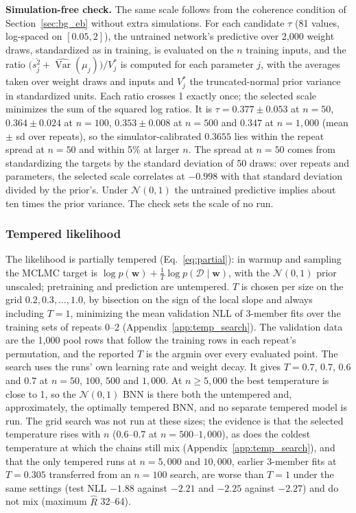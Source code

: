 \documentclass[11pt]{article}
\begin{document}
\textbf{Simulation-free check.} The same scale follows from the coherence condition of Section~\ref{sec:bg_eb} without
extra simulations. For each candidate $\tau$ (81 values, log-spaced on $[0.05,2]$), the untrained network's predictive
over 2{,}000 weight draws, standardized as in training, is evaluated on the $n$ training inputs, and the ratio
$\big(\overline{s_j^2}+\widehat{\operatorname{Var}}(\mu_j)\big)/V_j^\ast$ is computed for each parameter $j$, with the
averages taken over weight draws and inputs and $V_j^\ast$ the truncated-normal prior variance in standardized units.
Each ratio crosses 1 exactly once; the selected scale minimizes the sum of the squared log ratios. It is
$\tau=0.377\pm0.053$ at $n=50$, $0.364\pm0.024$ at $n=100$, $0.353\pm0.008$ at $n=500$ and $0.347$ at $n=1{,}000$
(mean $\pm$ sd over repeats), so the simulator-calibrated $0.3655$ lies within the repeat spread at $n=50$ and within
5\% at larger $n$. The spread at $n=50$ comes from standardizing the targets by the standard deviation of 50 draws: over
repeats and parameters, the selected scale correlates at $-0.998$ with that standard deviation divided by the prior's.
Under $\mathcal{N}(0,1)$ the untrained predictive implies about ten times the prior variance. The check sets the scale
of no run.

\subsubsection{Tempered likelihood}
\label{sec:bnn_temp}
The likelihood is partially tempered (Eq.~\eqref{eq:partial}): in warmup and sampling the MCLMC target is
$\log p(\mathbf w)+\tfrac1T\log p(\mathcal{D}\mid\mathbf w)$, with the $\mathcal{N}(0,1)$ prior unscaled; pretraining
and prediction are untempered. $T$ is chosen per size on the grid $0.2,0.3,\dots,1.0$, by bisection on the sign of the
local slope and always including $T=1$, minimizing the mean validation NLL of 3-member fits over the training sets of repeats 0--2 (Appendix~\ref{app:temp_search}). The
validation data are the 1{,}000 pool rows that follow the training rows in each repeat's permutation, and the reported
$T$ is the argmin over every evaluated point. The search uses the runs' own learning rate and weight decay. It gives
$T=0.7$, $0.7$, $0.6$ and $0.7$ at $n=50$, $100$, $500$ and $1{,}000$. At $n\ge5{,}000$ the best temperature is close to 1, so the $\mathcal N(0,1)$ BNN is there
both the untempered and, approximately, the optimally tempered BNN, and no separate tempered model is run. The grid
search was not run at these sizes; the evidence is that the selected temperature rises with $n$ (0.6--0.7 at
$n=500$--$1{,}000$), as does the coldest temperature at which the chains still mix (Appendix~\ref{app:temp_search}), and
that the only tempered runs at $n=5{,}000$ and $10{,}000$, earlier 3-member fits at $T=0.305$ transferred from an
$n=100$ search, are worse than $T=1$ under the same settings (test NLL $-1.88$ against $-2.21$ and $-2.25$ against
$-2.27$) and do not mix (maximum $\widehat R$ 32--64).
\end{document}
